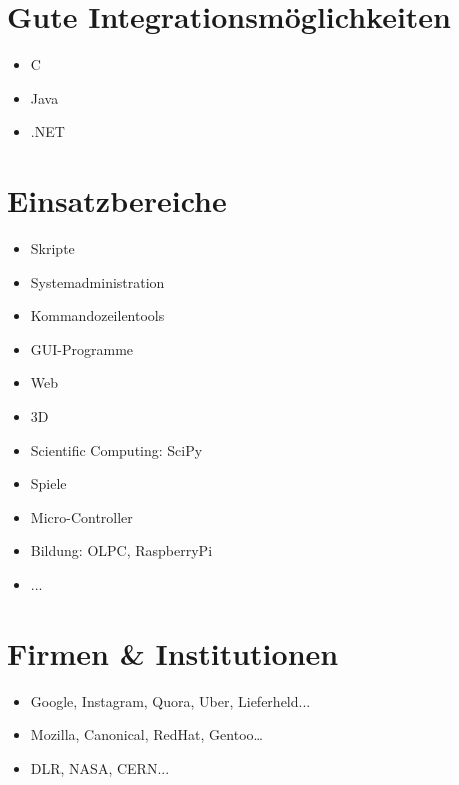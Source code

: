 \documentclass[letterpaper,10pt,ngerman]{sphinxmanual}
\begin{document}
\chapter{Gute Integrationsmöglichkeiten}
\label{index:gute-integrationsmoglichkeiten}\begin{itemize}
\item {} 
C

\item {} 
Java

\item {} 
.NET

\end{itemize}


\chapter{Einsatzbereiche}
\label{index:einsatzbereiche}\begin{itemize}
\item {} 
Skripte

\item {} 
Systemadministration

\item {} 
Kommandozeilentools

\item {} 
GUI-Programme

\item {} 
Web

\item {} 
3D

\item {} 
Scientific Computing: SciPy

\item {} 
Spiele

\item {} 
Micro-Controller

\item {} 
Bildung: OLPC, RaspberryPi

\item {} 
...

\end{itemize}


\chapter{Firmen \& Institutionen}
\label{index:firmen-institutionen}\begin{itemize}
\item {} 
Google, Instagram, Quora, Uber, Lieferheld...

\item {} 
Mozilla, Canonical, RedHat, Gentoo…

\item {} 
DLR, NASA, CERN...

\end{itemize}
\end{document}
